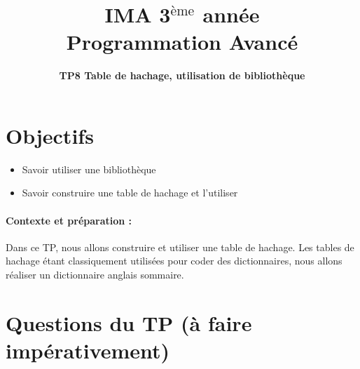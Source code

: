 \documentclass[final, pdftex, a4paper, openbib, ]{article}
\title{IMA 3$^{\mbox{\`eme}}$ année\\ Programmation Avancé
}
\author{\huge \textbf{TP8 Table de hachage, utilisation de bibliothèque}}
\date{}
\let\OldTexttt\texttt
\renewcommand{\texttt}[1]{\OldTexttt{\hl{#1}}}
\begin{document}
\posttitle{\par\end{center}}
\setlength{\droptitle}{-45pt}
\maketitle

\vspace{-1.7cm}
\section{Objectifs}

\begin{itemize}
	\item Savoir utiliser une bibliothèque
	\item Savoir construire une table de hachage et l'utiliser
\end{itemize}


\paragraph{Contexte et préparation : }
Dans ce TP, nous allons construire et utiliser une table de hachage. Les tables de hachage étant classiquement utilisées pour coder des dictionnaires, nous allons réaliser un dictionnaire anglais sommaire.


\section{Questions du TP \large (à faire impérativement)}
\end{document}
